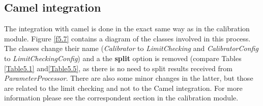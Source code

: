 \subsection{Camel integration}

The integration with camel is done in the exact same way as in the calibration module. Figure \ref{f5.7} contains a diagram of the classes involved in this process. The classes change their name (\emph{Calibrator} to \emph{LimitChecking} and \emph{CalibratorConfig} to \emph{LimitCheckingConfig}) and a the \textbf{split} option is removed (compare Tables \ref{Table5.1} and\ref{Table5.5}, as there is no need to split results received from \emph{ParameterProcessor}. There are also some minor changes in the latter, but those are related to the limit checking and not to the Camel integration. For more information please see the correspondent section in the calibration module.

